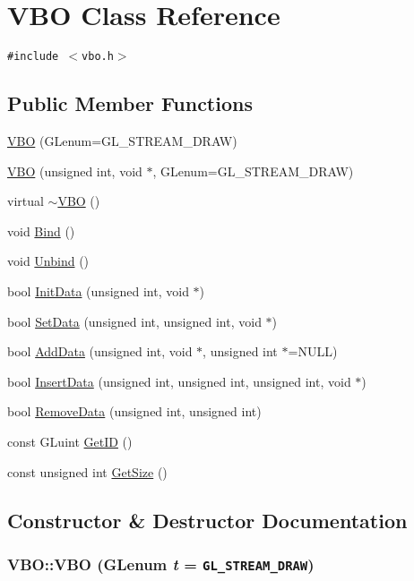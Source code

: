 \hypertarget{class_v_b_o}{
\section{VBO Class Reference}
\label{class_v_b_o}
}
{\tt \#include $<$vbo.h$>$}

\subsection*{Public Member Functions}
\begin{CompactItemize}
\item 
\hyperlink{class_v_b_o_dd64f9cab4f62e84c6ca5d81637dc4da}{VBO} (GLenum=GL\_\-STREAM\_\-DRAW)
\item 
\hyperlink{class_v_b_o_d4441d2606b0e217063d3ef7b88d9d67}{VBO} (unsigned int, void $\ast$, GLenum=GL\_\-STREAM\_\-DRAW)
\item 
virtual \hyperlink{class_v_b_o_a1f948bfcd73951c3a8369f5443f4678}{$\sim$VBO} ()
\item 
void \hyperlink{class_v_b_o_f7ce2a599aecbcf9b97d3f30b294a0b2}{Bind} ()
\item 
void \hyperlink{class_v_b_o_4b3db8676fbf6dd90d47ed91cafb0abb}{Unbind} ()
\item 
bool \hyperlink{class_v_b_o_d44ea0badd80c76c6b49c142ab630151}{InitData} (unsigned int, void $\ast$)
\item 
bool \hyperlink{class_v_b_o_fc9f1fd3d2a23ad63f3eecd24d9fe6e9}{SetData} (unsigned int, unsigned int, void $\ast$)
\item 
bool \hyperlink{class_v_b_o_867f6324a099128d6449c2d1036393e2}{AddData} (unsigned int, void $\ast$, unsigned int $\ast$=NULL)
\item 
bool \hyperlink{class_v_b_o_d8bcc72c1a47cc233fc19f3e9bb9da72}{InsertData} (unsigned int, unsigned int, unsigned int, void $\ast$)
\item 
bool \hyperlink{class_v_b_o_3b586a184a4162ae9865846951af35e2}{RemoveData} (unsigned int, unsigned int)
\item 
const GLuint \hyperlink{class_v_b_o_f5e2f7610be062e07be7ce68ccaabfb7}{GetID} ()
\item 
const unsigned int \hyperlink{class_v_b_o_cd9fa7ebdb18c7d788b076317a07c6ef}{GetSize} ()
\end{CompactItemize}


\subsection{Constructor \& Destructor Documentation}
\hypertarget{class_v_b_o_dd64f9cab4f62e84c6ca5d81637dc4da}{
\subsubsection[{VBO}]{\setlength{\rightskip}{0pt plus 5cm}VBO::VBO (GLenum {\em t} = {\tt GL\_\-STREAM\_\-DRAW})}}
\label{class_v_b_o_dd64f9cab4f62e84c6ca5d81637dc4da}


